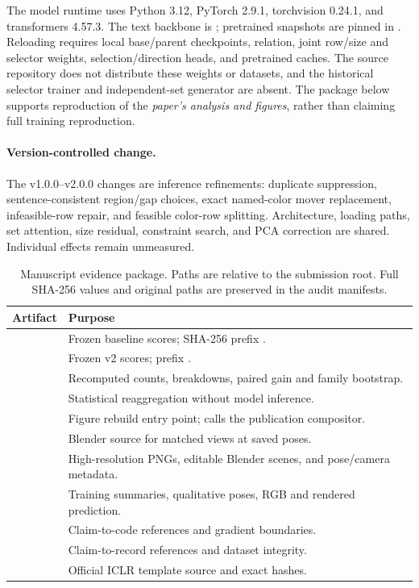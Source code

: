 The model runtime uses Python 3.12, PyTorch 2.9.1, torchvision 0.24.1, and transformers 4.57.3. The text backbone is ; pretrained snapshots are pinned in . Reloading requires local base/parent checkpoints, relation, joint row/size and selector weights, selection/direction heads, and pretrained caches. The source repository does not distribute these weights or datasets, and the historical selector trainer and independent-set generator are absent. The package below supports reproduction of the \emph{paper's analysis and figures}, rather than claiming full training reproduction.

\paragraph{Version-controlled change.}
The v1.0.0--v2.0.0 changes are inference refinements: duplicate suppression, sentence-consistent region/gap choices, exact named-color mover replacement, infeasible-row repair, and feasible color-row splitting. Architecture, loading paths, set attention, size residual, constraint search, and PCA correction are shared. Individual effects remain unmeasured.

\begin{table}[H]
\centering\small
\caption{Manuscript evidence package. Paths are relative to the submission root. Full SHA-256 values and original paths are preserved in the audit manifests.}
\label{tab:package}
\begin{tabularx}{\linewidth}{@{}lY@{}}\toprule
\textbf{Artifact} & \textbf{Purpose} \\\midrule
{} & Frozen baseline scores; SHA-256 prefix . \\
 & Frozen v2 scores; prefix . \\
 & Recomputed counts, breakdowns, paired gain and family bootstrap. \\
 & Statistical reaggregation without model inference. \\
 & Figure rebuild entry point; calls the publication compositor. \\
 & Blender source for matched views at saved poses. \\
 & High-resolution PNGs, editable Blender scenes, and pose/camera metadata. \\
 & Training summaries, qualitative poses, RGB and rendered prediction. \\
 & Claim-to-code references and gradient boundaries. \\
 & Claim-to-record references and dataset integrity. \\
 & Official ICLR template source and exact hashes. \\\bottomrule
\end{tabularx}
\end{table}

